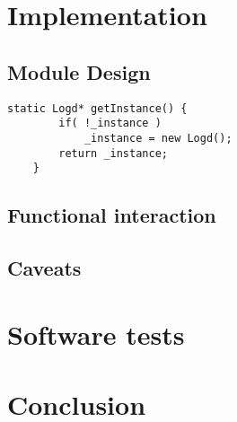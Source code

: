 \documentclass[oneside,bachelor,etd]{BYUPhys}
\begin{document}
	

\chapter{Implementation}
\section{Module Design}
\label{sec:3moddesign}

\begin{lstlisting}[label=The Singleton pattern,caption=The Singleton pattern]
	static Logd* getInstance() {
		if( !_instance )
        	_instance = new Logd();
		return _instance;
	}
\end{lstlisting}




\section{Functional interaction}
\label{sec:3interaction}
\section{Caveats}
\label{sec:3caveats}


\chapter{Software tests}


\chapter{Conclusion}




\appendix

\end{document}
